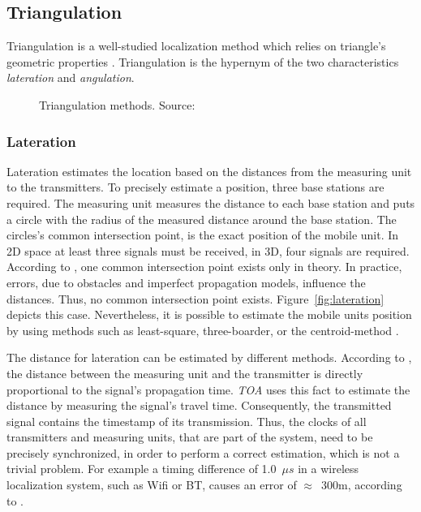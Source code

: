 \subsection{Triangulation}\label{sec:fund_trilateration}
Triangulation is a well-studied localization method which relies on triangle's geometric properties \citep{IEEE:survey_wireless_indoor_pos, wang:bt_pos}. Triangulation is the hypernym of the two characteristics \emph{lateration} and \emph{angulation}.

\begin{figure}[width=0.9\textwidth, height=0.4\textheight]
	
	\caption {Triangulation methods. Source:~\citep{wang:bt_pos}}
	\label{fig:triangulation}
\end{figure}

\subsubsection*{Lateration}
Lateration estimates the location based on the distances from the measuring unit to the transmitters. To precisely estimate a position, three base stations are required. The measuring unit measures the distance to each base station and puts a circle with the radius of the measured distance around the base station. The circles's common intersection point, is the exact position of the mobile unit. In 2D space at least three signals must be received, in 3D, four signals are required. According to \citet{wang:bt_pos}, one common intersection point exists only in theory. In practice, errors, due to obstacles and imperfect propagation models, influence the distances. Thus, no common intersection point exists. Figure~\ref{fig:lateration} depicts this case. Nevertheless, it is possible to estimate the mobile units position by using methods such as least-square, three-boarder, or the centroid-method \citep{wang:bt_pos, IEEE:survey_wireless_indoor_pos}.  

The distance for lateration can be estimated by different methods. According to \citet{IEEE:survey_wireless_indoor_pos}, the distance between the measuring unit and the transmitter is directly proportional to the signal's propagation time.
\emph{\ac{TOA}} uses this fact to estimate the distance by measuring the signal's travel time. Consequently, the transmitted signal contains the timestamp of its transmission. Thus, the clocks of all transmitters and measuring units, that are part of the system, need to be precisely synchronized, in order to perform a correct estimation, which is not a trivial problem. For example a timing difference of 1.0~$\mu s$ in a wireless localization system, such as Wifi or \ac{BT}, causes an error of $\approx$~300m, according to \citet{kotanen:exp_local_pos_bt}.

